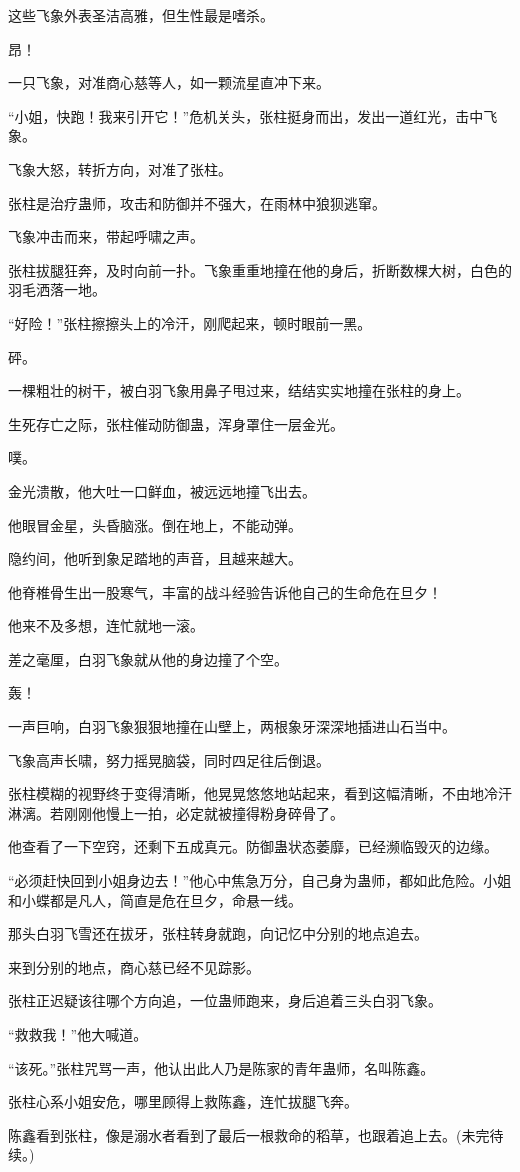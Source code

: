 \begin{this_body}
这些飞象外表圣洁高雅，但生性最是嗜杀。

昂！

一只飞象，对准商心慈等人，如一颗流星直冲下来。

“小姐，快跑！我来引开它！”危机关头，张柱挺身而出，发出一道红光，击中飞象。

飞象大怒，转折方向，对准了张柱。

张柱是治疗蛊师，攻击和防御并不强大，在雨林中狼狈逃窜。

飞象冲击而来，带起呼啸之声。

张柱拔腿狂奔，及时向前一扑。飞象重重地撞在他的身后，折断数棵大树，白色的羽毛洒落一地。

“好险！”张柱擦擦头上的冷汗，刚爬起来，顿时眼前一黑。

砰。

一棵粗壮的树干，被白羽飞象用鼻子甩过来，结结实实地撞在张柱的身上。

生死存亡之际，张柱催动防御蛊，浑身罩住一层金光。

噗。

金光溃散，他大吐一口鲜血，被远远地撞飞出去。

他眼冒金星，头昏脑涨。倒在地上，不能动弹。

隐约间，他听到象足踏地的声音，且越来越大。

他脊椎骨生出一股寒气，丰富的战斗经验告诉他自己的生命危在旦夕！

他来不及多想，连忙就地一滚。

差之毫厘，白羽飞象就从他的身边撞了个空。

轰！

一声巨响，白羽飞象狠狠地撞在山壁上，两根象牙深深地插进山石当中。

飞象高声长啸，努力摇晃脑袋，同时四足往后倒退。

张柱模糊的视野终于变得清晰，他晃晃悠悠地站起来，看到这幅清晰，不由地冷汗淋漓。若刚刚他慢上一拍，必定就被撞得粉身碎骨了。

他查看了一下空窍，还剩下五成真元。防御蛊状态萎靡，已经濒临毁灭的边缘。

“必须赶快回到小姐身边去！”他心中焦急万分，自己身为蛊师，都如此危险。小姐和小蝶都是凡人，简直是危在旦夕，命悬一线。

那头白羽飞雪还在拔牙，张柱转身就跑，向记忆中分别的地点追去。

来到分别的地点，商心慈已经不见踪影。

张柱正迟疑该往哪个方向追，一位蛊师跑来，身后追着三头白羽飞象。

“救救我！”他大喊道。

“该死。”张柱咒骂一声，他认出此人乃是陈家的青年蛊师，名叫陈鑫。

张柱心系小姐安危，哪里顾得上救陈鑫，连忙拔腿飞奔。

陈鑫看到张柱，像是溺水者看到了最后一根救命的稻草，也跟着追上去。(未完待续。)

\end{this_body}

